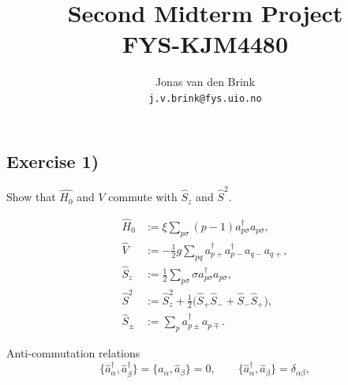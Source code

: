 \documentclass[a4paper, 11pt, notitlepage, english]{article}
\author{Jonas van den Brink \\ \texttt{j.v.brink@fys.uio.no}}
\title{Second Midterm Project \\ FYS-KJM4480}
\newcommand{\op}[1]{\hat{#1}}
\begin{document}
\maketitle

\clearpage

\subsection*{Exercise 1)}
Show that $\op{H_0}$ and $V$ commute with $\op{S}_z$ and $\op{S}^2$.

\begin{align*}
	\op{H}_0 &:= \xi \sum_{p \sigma} (p-1)a_{p\sigma}^\dagger a_{p\sigma}, \\
	\op{V} &:= -\frac{1}{2}g \sum_{p q} a_{p+}^\dagger a_{p-}^\dagger a_{q-} a_{q+}, \\
	\op{S}_z &:= \frac{1}{2}\sum_{p\sigma} \sigma a_{p\sigma}^\dagger a_{p\sigma}, \\
	\op{S}^2 &:= \op{S}_z^2 + \frac{1}{2}\big(\op{S}_+\op{S}_- + \op{S}_-\op{S}_+\big), \\
	\op{S}_\pm &:= \sum_p a_{p\pm}^\dagger a_{p\mp}.
\end{align*}

Anti-commutation relations
$$\{\op{a}_\alpha^\dagger, \op{a}_\beta^\dagger \} = \{\op{a}_\alpha, \op{a}_\beta \} = 0, \qquad \{\op{a}_\alpha^\dagger, \op{a}_\beta \} = \delta_{\alpha\beta},$$
\end{document}
